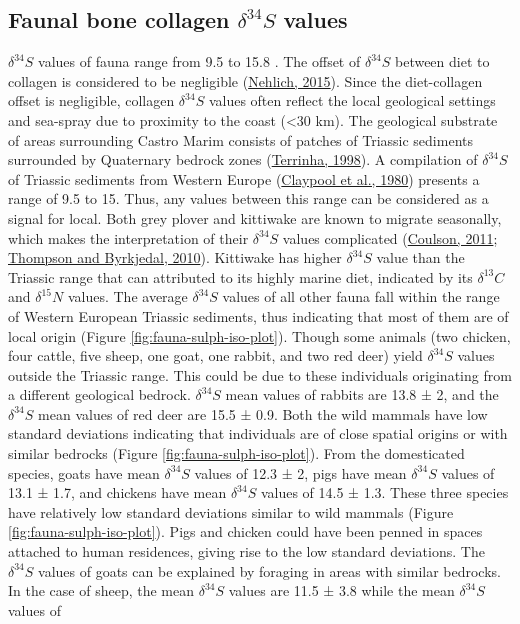 \documentclass[3p]{elsarticle} %
\begin{document}
\hypertarget{sulphur}{%
\subsection{\texorpdfstring{Faunal bone collagen \(\delta ^{34}S\) values}{Faunal bone collagen \textbackslash delta \^{}\{34\}S values}}\label{sulphur}}

\(\delta ^{34}S\) values of fauna range from 9.5 \text{\textperthousand} to 15.8 \text{\textperthousand}. The offset of \(\delta ^{34}S\) between diet to collagen is considered to be negligible (\protect\hyperlink{ref-nehlich15}{Nehlich, 2015}). Since the diet-collagen offset is negligible, collagen \(\delta ^{34}S\) values often reflect the local geological settings and sea-spray due to proximity to the coast (\textless30 km). The geological substrate of areas surrounding Castro Marim consists of patches of Triassic sediments surrounded by Quaternary bedrock zones (\protect\hyperlink{ref-terrinha98}{Terrinha, 1998}). A compilation of \(\delta ^{34}S\) of Triassic sediments from Western Europe (\protect\hyperlink{ref-claypool_etal80}{Claypool et al., 1980}) presents a range of 9.5\text{\textperthousand} to 15\text{\textperthousand}. Thus, any values between this range can be considered as a signal for local. Both grey plover and kittiwake are known to migrate seasonally, which makes the interpretation of their \(\delta ^{34}S\) values complicated (\protect\hyperlink{ref-coulson11}{Coulson, 2011}; \protect\hyperlink{ref-thompsonbyrkjedal10}{Thompson and Byrkjedal, 2010}). Kittiwake has higher \(\delta ^{34}S\) value than the Triassic range that can attributed to its highly marine diet, indicated by its \(\delta ^{13}C\) and \(\delta ^{15}N\) values. The average \(\delta ^{34}S\) values of all other fauna fall within the range of Western European Triassic sediments, thus indicating that most of them are of local origin (Figure \ref{fig:fauna-sulph-iso-plot}). Though some animals (two chicken, four cattle, five sheep, one goat, one rabbit, and two red deer) yield \(\delta ^{34}S\) values outside the Triassic range. This could be due to these individuals originating from a different geological bedrock. \(\delta ^{34}S\) mean values of rabbits are 13.8 ± 2\text{\textperthousand}, and the \(\delta ^{34}S\) mean values of red deer are 15.5 ± 0.9\text{\textperthousand}. Both the wild mammals have low standard deviations indicating that individuals are of close spatial origins or with similar bedrocks (Figure \ref{fig:fauna-sulph-iso-plot}). From the domesticated species, goats have mean \(\delta ^{34}S\) values of 12.3 ± 2\text{\textperthousand}, pigs have mean \(\delta ^{34}S\) values of 13.1 ± 1.7\text{\textperthousand}, and chickens have mean \(\delta ^{34}S\) values of 14.5 ± 1.3\text{\textperthousand}. These three species have relatively low standard deviations similar to wild mammals (Figure \ref{fig:fauna-sulph-iso-plot}). Pigs and chicken could have been penned in spaces attached to human residences, giving rise to the low standard deviations. The \(\delta ^{34}S\) values of goats can be explained by foraging in areas with similar bedrocks. In the case of sheep, the mean \(\delta ^{34}S\) values are 11.5 ± 3.8\text{\textperthousand} while the mean \(\delta ^{34}S\) values of 
\end{document}
